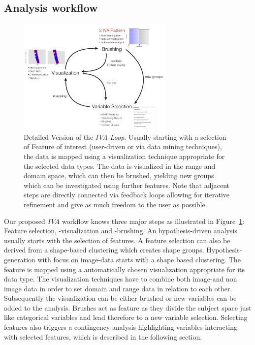\documentclass[journal]{style/vgtc} 			          %
\begin{document}
\subsection{Analysis workflow}
\begin{figure}[htb]
 \centering
 \includegraphics[width=3.0in]{figures/InteractionLoop}
 \caption{Detailed Version of the \emph{IVA Loop}. Usually starting with a selection of Feature of interest (user-driven or via data mining techniques), the data is mapped using a visualization technique appropriate for the selected data types. The data is visualized in the range and domain space, which can then be brushed, yielding new groups which can be investigated using further features. Note that adjacent steps are directly connected via feedback loops allowing for iterative refinement and give as much freedom to the user as possible.}
 \label{fig:InteractionLoop}
\end{figure}
Our proposed \emph{IVA} workflow knows three major steps as illustrated in Figure~\ref{fig:InteractionLoop}: Feature selection, -visualization and -brushing.
%
An hypothesis-driven analysis usually starts with the selection of features.
%
A feature selection can also be derived from a shape-based clustering which creates shape groups.
%
Hypothesis-generation with focus on image-data starts with a shape based clustering.
%
The feature is mapped using a automatically chosen visualization appropriate for its data type.
%
The visualization techniques have to combine both image-and non image data in order to set domain and range data in relation to each other.
%
Subsequently the visualization can be either brushed or new variables can be added to the analysis.
%
Brushes act as feature as they divide the subject space just like categorical variables and lead therefore to a new variable selection.
%
Selecting features also triggers a contingency analysis highlighting variables interacting with selected features, which is described in the following section.
\end{document}
